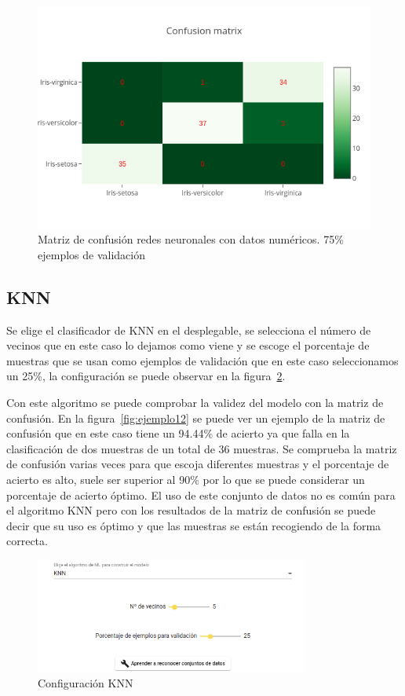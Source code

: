 \documentclass[a4paper, 12pt]{book}
\begin{document}
\begin{figure}
	\centering
	\includegraphics[width=12cm, keepaspectratio]{img/cm_num_rn2.png}
	\caption{Matriz de confusión redes neuronales con datos numéricos. 75\% ejemplos de validación} 	
	\label{fig:ejemplo10}
\end{figure}

\subsection{KNN}
\label{subsec:knn}

Se elige el clasificador de KNN en el desplegable, se selecciona el número de vecinos que en este caso lo dejamos como viene y se escoge el porcentaje de muestras que se usan como ejemplos de validación que en este caso seleccionamos un 25\%, la configuración se puede observar en la figura~\ref{fig:ejemplo11}.

Con este algoritmo se puede comprobar la validez del modelo con la matriz de confusión. En la figura~\ref{fig:ejemplo12} se puede ver un ejemplo de la matriz de confusión que en este caso tiene un 94.44\% de acierto ya que falla en la clasificación de dos muestras de un total de 36 muestras. Se comprueba la matriz de confusión varias veces para que escoja diferentes muestras y el porcentaje de acierto es alto, suele ser superior al 90\% por lo que se puede considerar un porcentaje de acierto óptimo. El uso de este conjunto de datos no es común para el algoritmo KNN pero con los resultados de la matriz de confusión se puede decir que su uso es óptimo y que las muestras se están recogiendo de la forma correcta.

\begin{figure}
	\centering
	\includegraphics[width=9cm, keepaspectratio]{img/ej_num_knn.png}
	\caption{Configuración KNN} 	\label{fig:ejemplo11}
\end{figure}
\end{document}
